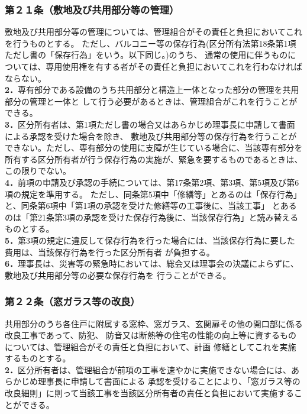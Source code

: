 \documentclass[
  luatex,
  paper=a4paper,
  fontsize=11pt,
  jafontsize=11pt,
  jlreq_notes,
]{jlreq}
\begin{document}
  \subsubsection*{第２１条（敷地及び共用部分等の管理）}
  敷地及び共用部分等の管理については、管理組合がその責任と負担においてこれを行うものとする。
  ただし、バルコニー等の保存行為(区分所有法第18条第1項ただし書の「保存行為」をいう。以下同じ。)のうち、
  通常の使用に伴うものについては、専用使用権を有する者がその責任と負担においてこれを行わなければならない。\\
  \textbf{2．}専有部分である設備のうち共用部分と構造上一体となった部分の管理を共用部分の管理と一体と
  して行う必要があるときは、管理組合がこれを行うことができる。\\
  \textbf{3．}区分所有者は、第1項ただし書の場合又はあらかじめ理事長に申請して書面による承認を受けた場合を除き、
  敷地及び共用部分等の保存行為を行うことができない。ただし、専有部分の使用に支障が生じている場合に、当該専有部分を
  所有する区分所有者が行う保存行為の実施が、緊急を要するものであるときは、この限りでない。\\
  \textbf{4．}前項の申請及び承認の手続については、第17条第2項、第3項、第5項及び第6項の規定を準用する。
  ただし、同条第5項中「修繕等」とあるのは「保存行為」と、同条第6項中「第1項の承認を受けた修繕等の工事後に、当該工事」
  とあるのは「第21条第3項の承認を受けた保存行為後に、当該保存行為」と読み替えるものとする。\\
  \textbf{5．}第3項の規定に違反して保存行為を行った場合には、当該保存行為に要した費用は、当該保存行為を行った区分所有者
  が負担する。\\
  \textbf{6．}理事長は、災害等の緊急時においては、総会又は理事会の決議によらずに、敷地及び共用部分等の必要な保存行為を
  行うことができる。\\
  
  \subsubsection*{第２２条（窓ガラス等の改良）}
  共用部分のうち各住戸に附属する窓枠、窓ガラス、玄関扉その他の開口部に係る改良工事であって、防犯、
  防音又は断熱等の住宅の性能の向上等に資するものについては、管理組合がその責任と負担において、計画
  修繕としてこれを実施するものとする。\\
  \textbf{2．}区分所有者は、管理組合が前項の工事を速やかに実施できない場合には、あらかじめ理事長に申請して書面による
  承認を受けることにより、「窓ガラス等の改良細則」に則って当該工事を当該区分所有者の責任と負担において実施することができる。\\
          
\end{document}
